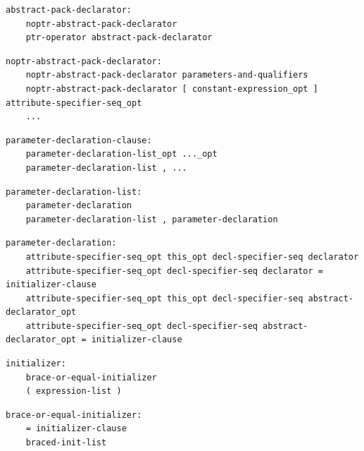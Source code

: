 \noindent\textbf{\texttt{}}\par
\begin{lstlisting}
abstract-pack-declarator:
    noptr-abstract-pack-declarator
    ptr-operator abstract-pack-declarator
\end{lstlisting}

\noindent\textbf{\texttt{}}\par
\begin{lstlisting}
noptr-abstract-pack-declarator:
    noptr-abstract-pack-declarator parameters-and-qualifiers
    noptr-abstract-pack-declarator [ constant-expression_opt ] attribute-specifier-seq_opt
    ...
\end{lstlisting}

\noindent\textbf{\texttt{}}\par
\begin{lstlisting}
parameter-declaration-clause:
    parameter-declaration-list_opt ..._opt
    parameter-declaration-list , ...
\end{lstlisting}

\noindent\textbf{\texttt{}}\par
\begin{lstlisting}
parameter-declaration-list:
    parameter-declaration
    parameter-declaration-list , parameter-declaration
\end{lstlisting}

\noindent\textbf{\texttt{}}\par
\begin{lstlisting}
parameter-declaration:
    attribute-specifier-seq_opt this_opt decl-specifier-seq declarator
    attribute-specifier-seq_opt decl-specifier-seq declarator = initializer-clause
    attribute-specifier-seq_opt this_opt decl-specifier-seq abstract-declarator_opt
    attribute-specifier-seq_opt decl-specifier-seq abstract-declarator_opt = initializer-clause
\end{lstlisting}

\noindent\textbf{\texttt{}}\par
\begin{lstlisting}
initializer:
    brace-or-equal-initializer
    ( expression-list )
\end{lstlisting}

\noindent\textbf{\texttt{}}\par
\begin{lstlisting}
brace-or-equal-initializer:
    = initializer-clause
    braced-init-list
\end{lstlisting}

